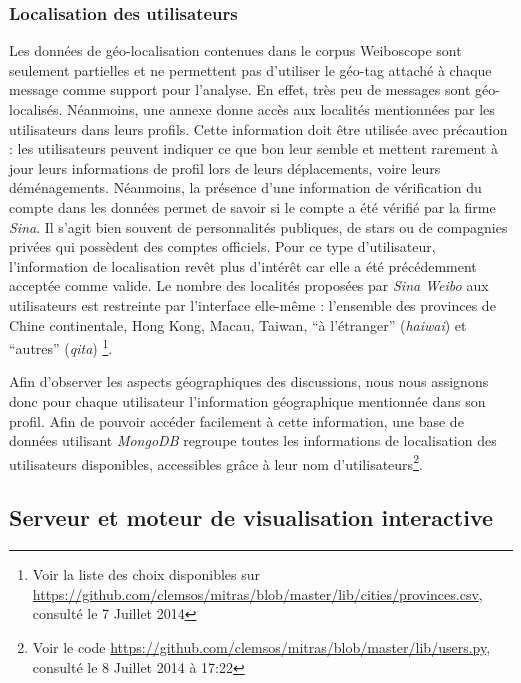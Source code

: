 \subsubsection[Localisation des utilisateurs]{Localisation des utilisateurs}
\label{sec:geoloc}
    Les données de géo-localisation contenues dans le corpus Weiboscope sont seulement partielles et ne permettent pas d'utiliser le géo-tag attaché à chaque message comme support pour l'analyse. En effet, très peu de messages sont géo-localisés. Néanmoins, une annexe donne accès aux localités mentionnées par les utilisateurs dans leurs profils. Cette information doit être utilisée avec précaution : les utilisateurs peuvent indiquer ce que bon leur semble et mettent rarement à jour leurs informations de profil lors de leurs déplacements, voire leurs déménagements. Néanmoins, la présence d'une information de vérification du compte dans les données permet de savoir si le compte a été vérifié par la firme \textit{Sina}. Il s'agit bien souvent de personnalités publiques, de stars ou de compagnies privées qui possèdent des comptes officiels. Pour ce type d'utilisateur, l'information de localisation revêt plus d'intérêt car elle a été  précédemment acceptée comme valide. Le nombre des localités proposées par \textit{Sina Weibo} aux utilisateurs est restreinte par l{\textquoteright}interface  elle-même : l{\textquoteright}ensemble des provinces de Chine continentale, Hong Kong, Macau, Taiwan, {\textquotedblleft}à l{\textquoteright}étranger{\textquotedblright} (\textit{haiwai}) et {\textquotedblleft}autres{\textquotedblright} (\textit{qita}) \footnote{Voir la liste des choix disponibles sur \url{https://github.com/clemsos/mitras/blob/master/lib/cities/provinces.csv}, consulté le 7 Juillet 2014}.

    Afin d'observer les aspects géographiques des discussions, nous nous assignons donc pour chaque utilisateur l{\textquoteright}information géographique mentionnée dans son profil. Afin de pouvoir accéder facilement à cette information, une base de données utilisant \textit{MongoDB} regroupe toutes les informations de localisation des utilisateurs disponibles, accessibles grâce à leur nom d'utilisateurs\footnote{Voir le code \url{https://github.com/clemsos/mitras/blob/master/lib/users.py}, consulté le 8 Juillet 2014 à 17:22}.


\subsection{Serveur et moteur de visualisation interactive}


